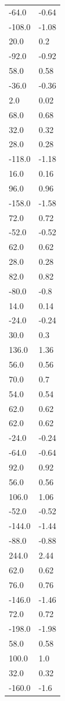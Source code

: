 \begin{longtable}{ll}
-64.0 & -0.64 \\
-108.0 & -1.08 \\
20.0 & 0.2 \\
-92.0 & -0.92 \\
58.0 & 0.58 \\
-36.0 & -0.36 \\
2.0 & 0.02 \\
68.0 & 0.68 \\
32.0 & 0.32 \\
28.0 & 0.28 \\
-118.0 & -1.18 \\
16.0 & 0.16 \\
96.0 & 0.96 \\
-158.0 & -1.58 \\
72.0 & 0.72 \\
-52.0 & -0.52 \\
62.0 & 0.62 \\
28.0 & 0.28 \\
82.0 & 0.82 \\
-80.0 & -0.8 \\
14.0 & 0.14 \\
-24.0 & -0.24 \\
30.0 & 0.3 \\
136.0 & 1.36 \\
56.0 & 0.56 \\
70.0 & 0.7 \\
54.0 & 0.54 \\
62.0 & 0.62 \\
62.0 & 0.62 \\
-24.0 & -0.24 \\
-64.0 & -0.64 \\
92.0 & 0.92 \\
56.0 & 0.56 \\
106.0 & 1.06 \\
-52.0 & -0.52 \\
-144.0 & -1.44 \\
-88.0 & -0.88 \\
244.0 & 2.44 \\
62.0 & 0.62 \\
76.0 & 0.76 \\
-146.0 & -1.46 \\
72.0 & 0.72 \\
-198.0 & -1.98 \\
58.0 & 0.58 \\
100.0 & 1.0 \\
32.0 & 0.32 \\
-160.0 & -1.6 \\

\end{longtable}
